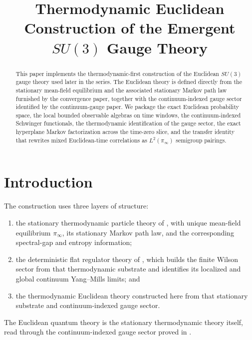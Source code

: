 \documentclass[11pt]{article}
\title{Thermodynamic Euclidean Construction of the Emergent $SU(3)$ Gauge Theory}
\author{}
\date{}
\theoremstyle{definition}
\theoremstyle{remark}
\begin{document}
\maketitle

\begin{abstract}
This paper implements the thermodynamic-first construction of the Euclidean
$SU(3)$ gauge theory used later in the series.  The Euclidean theory is defined
directly from the stationary mean-field equilibrium and the associated
stationary Markov path law furnished by the convergence paper, together with
the continuum-indexed gauge sector identified by the continuum-gauge paper.  We
package the exact Euclidean probability space, the local bounded observable
algebras on time windows, the continuum-indexed Schwinger functionals, the
thermodynamic identification of the gauge sector, the exact hyperplane Markov
factorization across the time-zero slice, and the transfer identity that
rewrites mixed Euclidean-time correlations as $L^2(\pi_\infty)$ semigroup
pairings.
\end{abstract}

\tableofcontents

\section{Introduction}

The construction uses three layers of structure:
\begin{enumerate}[leftmargin=1.5em]
\item the stationary thermodynamic particle theory of
\cite{convergence}, with unique mean-field equilibrium \(\pi_\infty\), its
stationary Markov path law, and the corresponding spectral-gap and entropy
information;
\item the deterministic flat regulator theory of \cite{continuumqft}, which
builds the finite Wilson sector from that thermodynamic substrate and identifies
its localized and global continuum Yang--Mills limits; and
\item the thermodynamic Euclidean theory constructed here from
that stationary substrate and continuum-indexed gauge sector.
\end{enumerate}

The Euclidean quantum theory is the stationary thermodynamic theory itself,
read through the continuum-indexed gauge sector proved in
\cite{continuumqft}.
\end{document}
